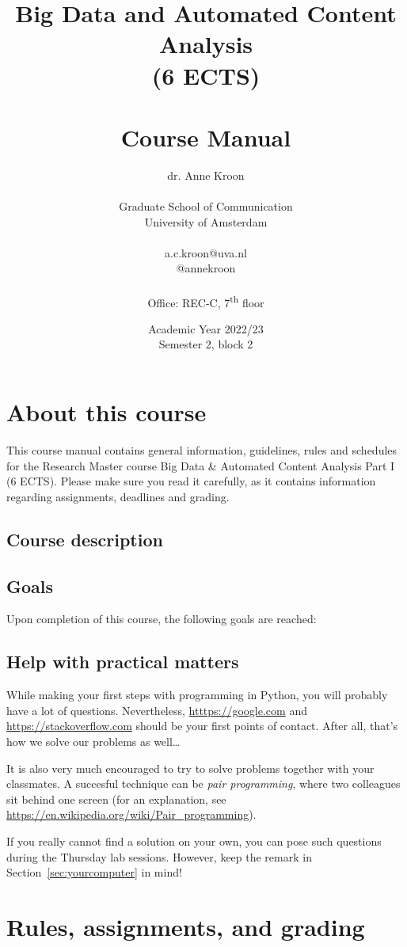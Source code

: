 \documentclass[a4paper,10pt,twocolumn]{report}
\title{Big Data and Automated Content Analysis\\ (6 ECTS)\\~\\Course Manual}
\author{dr. Anne Kroon\\~\\Graduate School of Communication\\University of Amsterdam\\~\\a.c.kroon@uva.nl \\@annekroon \\~\\Office: REC-C, 7\textsuperscript{th} floor}
\date{Academic Year 2022/23\\Semester 2, block  2\\ }
\begin{document}
\maketitle

\chapter{About this course}

This course manual contains general information, guidelines, rules and schedules for the Research Master course Big Data \& Automated Content Analysis Part I (6 ECTS). Please make sure you read it carefully, as it  contains information regarding assignments, deadlines and grading.

\section{Course description}



\section{Goals}


Upon completion of this course, the following goals are reached:





\section{Help with practical matters}
While making your first steps with programming in Python, you will probably have a lot of questions.
Nevertheless, \url{htttps://google.com} and \url{https://stackoverflow.com} should be your first points of contact. After all, that's how we solve our problems as well\ldots

It is also very much encouraged to try to solve problems together with your classmates. A succesful technique can be \emph{pair programming}, where two colleagues sit behind one screen (for an explanation, see \url{https://en.wikipedia.org/wiki/Pair_programming}).

If you really cannot find a solution on your own, you can pose such questions during the Thursday lab sessions. However, keep the remark in Section~\ref{sec:yourcomputer} in mind!

\chapter{Rules, assignments, and grading}

\end{document}
